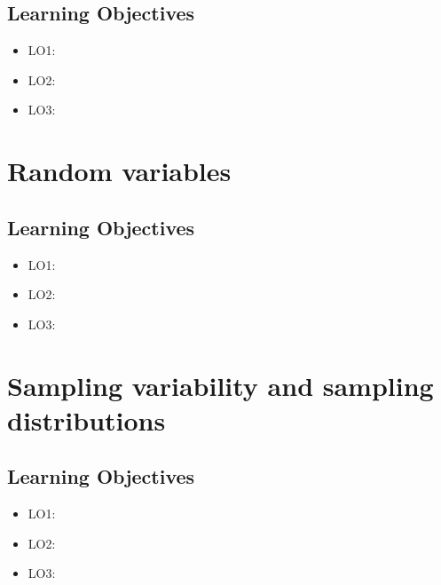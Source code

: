\documentclass[]{book}
\providecommand{\tightlist}{%
  \setlength{\itemsep}{0pt}\setlength{\parskip}{0pt}}
\begin{document}
\hypertarget{learning-objectives-6}{%
\section*{Learning Objectives}\label{learning-objectives-6}}

\begin{itemize}
\tightlist
\item
  LO1:
\item
  LO2:
\item
  LO3:
\end{itemize}

\hypertarget{chap-random-variables}{%
\chapter{Random variables}\label{chap-random-variables}}

\hypertarget{learning-objectives-7}{%
\section*{Learning Objectives}\label{learning-objectives-7}}

\begin{itemize}
\tightlist
\item
  LO1:
\item
  LO2:
\item
  LO3:
\end{itemize}

\hypertarget{chap-sampling}{%
\chapter{Sampling variability and sampling distributions}\label{chap-sampling}}

\hypertarget{learning-objectives-8}{%
\section*{Learning Objectives}\label{learning-objectives-8}}

\begin{itemize}
\tightlist
\item
  LO1:
\item
  LO2:
\item
  LO3:
\end{itemize}
\end{document}
